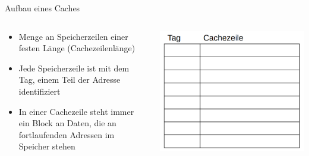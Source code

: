 \documentclass[
  german,            %
  aspectratio=169,    %
]{tumbeamer}
\begin{document}
\begin{frame}[c]{Aufbau eines Caches}{}
  \begin{columns}[c]
    \begin{column}{0.5\textwidth}
      \begin{itemize}
        \item Menge an Speicherzeilen einer festen Länge (Cachezeilenlänge) 
        \item Jede Speicherzeile ist mit dem Tag, einem Teil der Adresse identifiziert
        \item In einer Cachezeile steht immer ein Block an Daten, die an fortlaufenden Adressen im Speicher stehen
      \end{itemize}
    \end{column}
    \begin{column}{0.5\textwidth}
      \includegraphics[width=\linewidth]{w05_aufbauchaches_rep.png}
    \end{column}
  \end{columns}
\end{frame}
\end{document}
